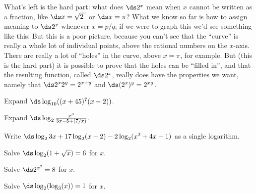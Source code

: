 What's left is the hard part: what does $\ds 2^x$ mean when $x$ cannot be
written as a fraction, like $\ds x=\sqrt{2\ }$ or $\ds x=\pi$? What we know so
far is how to assign meaning to $\ds 2^x$ whenever $x=p/q$; if we were to
graph this we'd see something like this:
But this is a poor picture, because you can't see that the ``curve''
is really a whole lot of individual points, above the rational numbers
on the $x$-axis. There are really a lot of ``holes'' in the curve,
above $x=\pi$, for example. But (this is the hard part) it is possible
to prove that the holes can be ``filled in'', and that the resulting
function, called $\ds 2^x$, really does have the properties we want,
namely that $\ds 2^x2^y=2^{x+y}$ and $\ds (2^x)^y=2^{xy}$.

\begin{exercises}

\begin{exercise} Expand $\ds\log_{10} ((x+45)^7 (x-2))$.
\end{exercise}

\begin{exercise} Expand $\ds\log_2 {x^3\over 3x-5 +(7/x)}$.
\end{exercise}

\begin{exercise} Write $\ds \log_2 3x + 17 \log_2 (x-2) -
2\log_2 (x^2 + 4x + 1)$ as a single logarithm.
\end{exercise}

\begin{exercise} Solve $\ds \log_2 (1+ \sqrt{x} ) = 6$ for  $x$.
\end{exercise}

\begin{exercise} Solve $\ds 2^{x^2} = 8$ for $x$.
\end{exercise}

\begin{exercise} Solve $\ds \log_2 (\log_3 (x) ) = 1$ for $x$.
\end{exercise}

\end{exercises}
